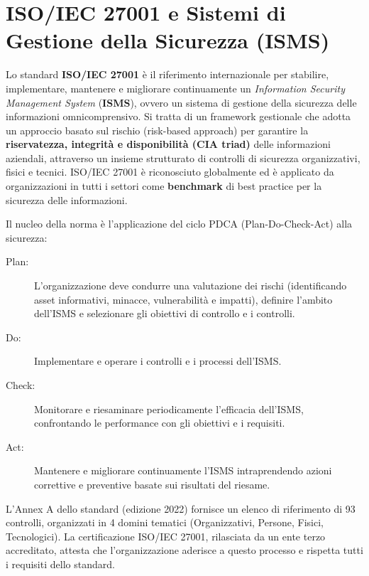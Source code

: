 \section{ISO/IEC 27001 e Sistemi di Gestione della Sicurezza (ISMS)}
\label{sec:iso_27001}
Lo standard \textbf{ISO/IEC 27001} è il riferimento internazionale per stabilire, implementare, mantenere e migliorare continuamente un \textit{Information Security Management System} (\textbf{ISMS}), ovvero un sistema di gestione della sicurezza delle informazioni omnicomprensivo. Si tratta di un framework gestionale che adotta un approccio basato sul rischio (risk-based approach) per garantire la \textbf{riservatezza, integrità e disponibilità (CIA triad)} delle informazioni aziendali, attraverso un insieme strutturato di controlli di sicurezza organizzativi, fisici e tecnici. ISO/IEC 27001 è riconosciuto globalmente ed è applicato da organizzazioni in tutti i settori come \textbf{benchmark} di best practice per la sicurezza delle informazioni.

Il nucleo della norma è l'applicazione del ciclo PDCA (Plan-Do-Check-Act) alla sicurezza:
\begin{description}
    \item[Plan:] L'organizzazione deve condurre una valutazione dei rischi (identificando asset informativi, minacce, vulnerabilità e impatti), definire l'ambito dell'ISMS e selezionare gli obiettivi di controllo e i controlli.
    \item[Do:] Implementare e operare i controlli e i processi dell'ISMS.
    \item[Check:] Monitorare e riesaminare periodicamente l'efficacia dell'ISMS, confrontando le performance con gli obiettivi e i requisiti.
    \item[Act:] Mantenere e migliorare continuamente l'ISMS intraprendendo azioni correttive e preventive basate sui risultati del riesame.
\end{description}
L'Annex A dello standard (edizione 2022) fornisce un elenco di riferimento di 93 controlli, organizzati in 4 domini tematici (Organizzativi, Persone, Fisici, Tecnologici). La certificazione ISO/IEC 27001, rilasciata da un ente terzo accreditato, attesta che l'organizzazione aderisce a questo processo e rispetta tutti i requisiti dello standard.

